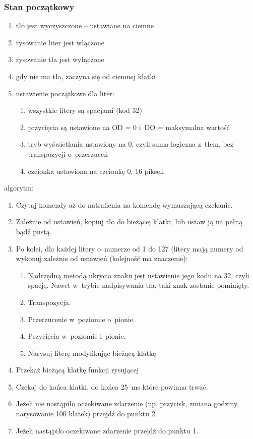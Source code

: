 \subsubsection{Stan początkowy}
\begin{enumerate}
\item tło jest wyczyszczone – ustawiane na ciemne
\item rysowanie liter jest włączone
\item rysowanie tła jest wyłączone
\item gdy nie ma tła, zaczyna się od ciemnej klatki
\item ustawienie początkowe dla liter:
\begin{enumerate}
\item wszystkie litery są spacjami (kod 32)
\item przycięcia są ustawione na OD = 0 i~DO = maksymalna wartość
\item tryb wyświetlania ustawiony na 0, czyli suma logiczna z~tłem, bez transpozycji o~przerzuceń
\item czcionka ustawiona na czcionkę 0, 16 pikseli
\end{enumerate}
\end{enumerate}
algorytm:
\begin{enumerate}
\item Czytaj komendy aż do natrafienia na komendę wymuszającą czekanie.
\item Zależnie od ustawień, kopiuj tło do bieżącej klatki, lub ustaw ją na pełną bądź pustą.
\item Po kolei, dla każdej litery o~numerze od 1 do 127 (litery mają numery od  wykonuj zależnie od ustawień (kolejność ma znaczenie):
\begin{enumerate}
\item Nadrzędną metodą ukrycia znaku jest ustawienie jego kodu na 32, czyli spację. Nawet w~trybie nadpisywania tła, taki znak zostanie pominięty.
\item Transpozycja.
\item Przerzucenie w~poziomie o~pionie.
\item Przycięcia w~poziomie i~pionie.
\item Narysuj literę modyfikując bieżącą klatkę
\end{enumerate}
\item Przekaż bieżącą klatkę funkcji rysującej
\item Czekaj do końca klatki, do końca 25~ms które powinna trwać.
\item Jeżeli nie nastąpiło oczekiwane zdarzenie (np. przycisk, zmiana godziny, narysowanie 100 klatek) przejdź do punktu 2.
\item Jeżeli nastąpiło oczekiwane zdarzenie przejdź do punktu 1.
\end{enumerate}

